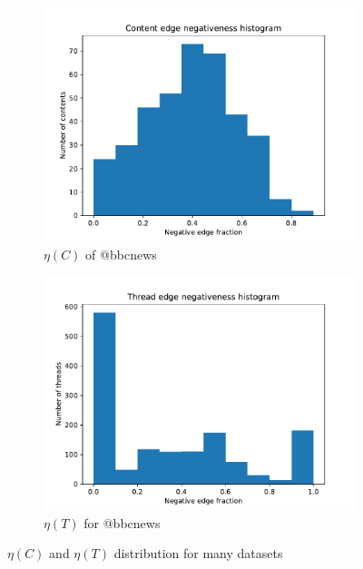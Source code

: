 \begin{figure}
\begin{center}
\begin{subfigure}[b]{0.4\textwidth}
			\includegraphics[width=\textwidth]{tex/out/bbcnews500/neg-fraction-content-hist.pdf}
			\caption{$\eta(C)$ of @bbcnews}
			\label{fig:CNN-content-eta}
		\end{subfigure}
		\begin{subfigure}[b]{0.4\textwidth}
			\centering
			\includegraphics[width=\textwidth]{tex/out/bbcnews500/neg-fraction-thread-hist.pdf}
			\caption{$\eta(T)$ for @bbcnews}
			\label{fig:CNN-thread-eta}
		\end{subfigure}
		\caption{$\eta(C)$ and $\eta(T)$ distribution for many datasets}
		\label{fig:eta-content-thread}
	\end{center}
\end{figure}

